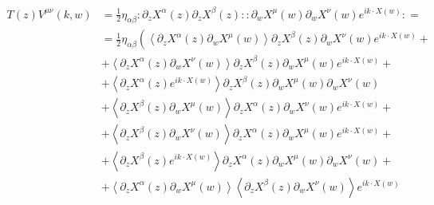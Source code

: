 \documentclass[10pt,a4paper]{article}
\begin{document}
    \begin{align*}
        T\left( z \right) V^{\mu\nu}\left( k, w \right) &= \frac{1}{2}
        \eta_{\alpha\beta} \colon \partial_z X^{\alpha}\left( z \right)
        \partial_z X^{\beta}\left( z \right) \colon \colon \partial_w
        X^{\mu}\left( w \right) \partial_w X^{\nu}\left( w \right) e^{i k \cdot
        X\left( w \right)} \colon =
        \\
        &= \frac{1}{2} \eta_{\alpha\beta} \left( \left\langle \partial_z
        X^{\alpha}\left( z \right) \partial_w X^{\mu}\left( w \right)
        \right\rangle \partial_z X^{\beta}\left( z \right) \partial_w
        X^{\nu}\left( w \right) e^{i k \cdot X\left( w \right)} + \right.
        \\
        &\left. + \left\langle \partial_z X^{\alpha}\left( z \right) \partial_w
        X^{\nu}\left( w \right) \right\rangle \partial_z X^{\beta}\left( z
        \right) \partial_w X^{\mu}\left( w \right) e^{i k \cdot X\left( w
        \right)} + \right.
        \\
        &\left. + \left\langle \partial_z X^{\alpha}\left( z \right) e^{i k
        \cdot X\left( w \right)} \right\rangle \partial_z X^{\beta}\left( z
        \right) \partial_w X^{\mu}\left( w \right) \partial_w X^{\nu}\left( w
        \right) \right.
        \\
        &\left. + \left\langle \partial_z
        X^{\beta}\left( z \right) \partial_w X^{\mu}\left( w \right)
        \right\rangle \partial_z X^{\alpha}\left( z \right) \partial_w
        X^{\nu}\left( w \right) e^{i k \cdot X\left( w \right)} + \right.
        \\
        &\left. + \left\langle \partial_z X^{\beta}\left( z \right) \partial_w
        X^{\nu}\left( w \right) \right\rangle \partial_z X^{\alpha}\left( z
        \right) \partial_w X^{\mu}\left( w \right) e^{i k \cdot X\left( w
        \right)} + \right.
        \\
        &\left. + \left\langle \partial_z X^{\beta}\left( z \right) e^{i k
        \cdot X\left( w \right)} \right\rangle \partial_z X^{\alpha}\left( z
        \right) \partial_w X^{\mu}\left( w \right) \partial_w X^{\nu}\left( w
        \right) + \right.
        \\
        &\left. + \left\langle \partial_z X^{\alpha}\left( z \right) \partial_w
        X^{\mu}\left( w \right) \right\rangle \left\langle \partial_z
        X^{\beta}\left( z \right) \partial_w X^{\nu}\left( w \right)
        \right\rangle e^{i k \cdot X\left( w \right)} \right.
        \\

\end{align*}
\end{document}
